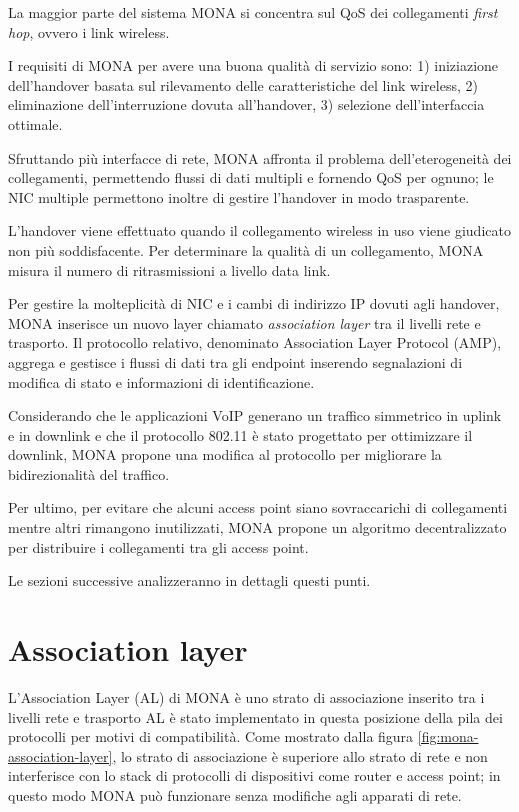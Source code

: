 \documentclass[12pt,a4paper,openright,twoside]{book}
\begin{document}
La maggior parte del sistema MONA si concentra sul QoS dei
collegamenti \emph{first hop}, ovvero i link wireless.

I requisiti di MONA per avere una buona qualità di servizio sono:
1) iniziazione dell'handover basata sul rilevamento delle
caratteristiche del link wireless, 2) eliminazione dell'interruzione
dovuta all'handover, 3) selezione dell'interfaccia ottimale.

Sfruttando più interfacce di rete, MONA affronta il problema
dell'eterogeneità dei collegamenti, permettendo flussi di dati
multipli e fornendo QoS per ognuno; le NIC multiple permettono inoltre
di gestire l'handover in modo trasparente.

L'handover viene effettuato quando il collegamento wireless in uso
viene giudicato non più soddisfacente. Per determinare la qualità di
un collegamento, MONA misura il numero di ritrasmissioni a livello
data link.

Per gestire la molteplicità di NIC e i cambi di indirizzo IP dovuti
agli handover, MONA inserisce un nuovo layer chiamato
\emph{association layer} tra il livelli rete e trasporto. Il
protocollo relativo, denominato Association Layer Protocol (AMP),
aggrega e gestisce i flussi di dati tra gli endpoint inserendo
segnalazioni di modifica di stato e informazioni di identificazione.

Considerando che le applicazioni VoIP generano un traffico simmetrico
in uplink e in downlink e che il protocollo 802.11 è stato progettato
per ottimizzare il downlink, MONA propone una modifica al protocollo
per migliorare la bidirezionalità del traffico.

Per ultimo, per evitare che alcuni access point siano sovraccarichi di
collegamenti mentre altri rimangono inutilizzati, MONA propone un
algoritmo decentralizzato per distribuire i collegamenti tra gli
access point.

Le sezioni successive analizzeranno in dettagli questi punti.

\section{Association layer}

L'Association Layer (AL) di MONA è uno strato di associazione inserito
tra i livelli rete e trasporto AL è stato implementato in questa
posizione della pila dei protocolli per motivi di compatibilità. Come
mostrato dalla figura \ref{fig:mona-association-layer}, lo strato di
associazione è superiore allo strato di rete e non interferisce con lo
stack di protocolli di dispositivi come router e access point; in
questo modo MONA può funzionare senza modifiche agli apparati di rete.
\end{document}
